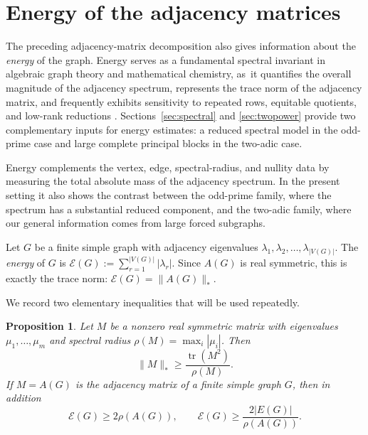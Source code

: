 \documentclass[12pt]{article}
\newtheorem{proposition}[theorem]{Proposition}
\theoremstyle{definition}
\newcommand{\tr}{\operatorname{tr}}
\begin{document}
	
	\section{Energy of the adjacency matrices}\label{sec:energy}
	
	The preceding adjacency-matrix decomposition also gives information about the \emph{energy} of the graph. Energy serves as a fundamental spectral invariant in algebraic graph theory and mathematical chemistry, as it quantifies the overall magnitude of the adjacency spectrum, represents the trace norm of the adjacency matrix, and frequently exhibits sensitivity to repeated rows, equitable quotients, and low-rank reductions \cite{gutman2001energy,li2012energy,nikiforov2007energy,nikiforov2016energy,bilalqm}.
	Sections~\ref{sec:spectral} and \ref{sec:twopower} provide two complementary inputs for energy estimates: a reduced spectral model in the odd-prime case and large complete principal blocks in the two-adic case.
	
	Energy complements the vertex, edge, spectral-radius, and nullity data by measuring the total absolute mass of the adjacency spectrum. In the present setting it also shows the contrast between the odd-prime family, where the spectrum has a substantial reduced component, and the two-adic family, where our general information comes from large forced subgraphs.
	
	Let $G$ be a finite simple graph with adjacency eigenvalues $\lambda_1,\lambda_2,\dots,\lambda_{|V(G)|}.$ The \emph{energy} of $G$ is $\mathcal E(G):=\sum_{r=1}^{|V(G)|} |\lambda_r|.$ Since $A(G)$ is real symmetric, this is exactly the trace norm: $\mathcal E(G)=\|A(G)\|_*$.  
	
	\medskip
	We record two elementary inequalities that will be used repeatedly.
	\begin{proposition}\label{prop:energybasic}
		Let $M$ be a nonzero real symmetric matrix with eigenvalues $\mu_1,\ldots,\mu_m$ and spectral radius $\rho(M)=\max_i|\mu_i|$. Then
		$$
		\|M\|_*\ge \frac{\tr(M^2)}{\rho(M)}.
		$$
		If $M=A(G)$ is the adjacency matrix of a finite simple graph $G$, then in addition
		$$
		\mathcal E(G)\ge 2\rho(A(G)),
		\qquad
		\mathcal E(G)\ge \frac{2|E(G)|}{\rho(A(G))}.
		$$
	\end{proposition}
	
\end{document}

